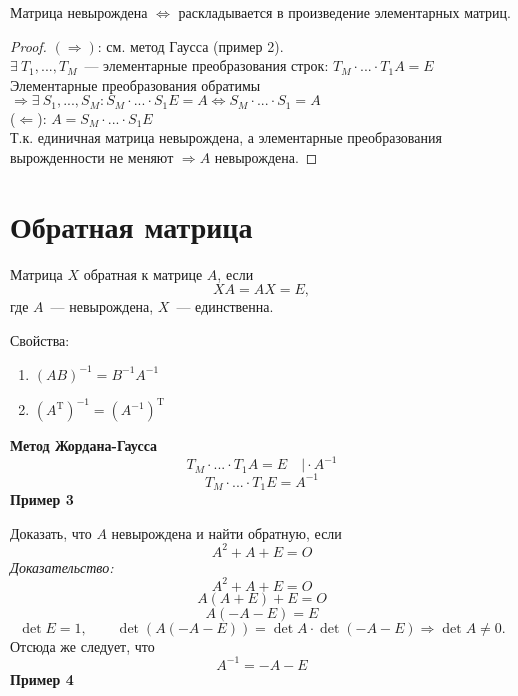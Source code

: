 \begin{theorem}
	Матрица невырождена $\Leftrightarrow$ раскладывается в произведение элементарных матриц.
\end{theorem}
\begin{proof}
$(\Rightarrow)$: см. метод Гаусса (пример 2).\\
$\exists\  T_1,...,T_M$~--- элементарные преобразования строк: $T_M\cdot ...\cdot T_1 A=E$\\
Элементарные преобразования обратимы $\Rightarrow \exists\  S_1,...,S_M: S_M\cdot ...\cdot S_1 E=A\Leftrightarrow S_M\cdot ...\cdot S_1=A$\\
($\Leftarrow$): $A=S_M\cdot ...\cdot S_1 E$\\
Т.к. единичная матрица невырождена, а элементарные преобразования вырожденности не меняют $\Rightarrow A$ невырождена.
\end{proof}
\section{Обратная матрица}
\begin{definition}
Матрица $X$ обратная к матрице $A$, если
$$XA=AX=E,$$
где $A$~--- невырождена, $X$~--- единственна.
\end{definition}

Свойства:
\begin{enumerate}
	\item $(AB)^{-1}=B^{-1}A^{-1}$
	\item $(A^{\mathrm{T}})^{-1}=(A^{-1})^{\mathrm{T}}$
\end{enumerate}

\textbf{Метод Жордана-Гаусса}\\
$$T_M\cdot...\cdot T_1 A=E \quad|\!\cdot A^{-1}$$
$$T_M\cdot...\cdot T_1 E = A^{-1}$$
\textbf{Пример 3}

Доказать, что $A$ невырождена и найти обратную, если
$$A^2+A+E=O$$
\textit{Доказательство:}
$$A^2+A+E=O$$
$$A(A+E)+E=O$$
$$A(-A-E)=E$$
$$\det E = 1,\qquad \det(A(-A-E))=\det A\cdot\det (-A-E) \Rightarrow \det A \neq 0.$$
Отсюда же следует, что $$A^{-1}=-A-E$$
\textbf{Пример 4}

